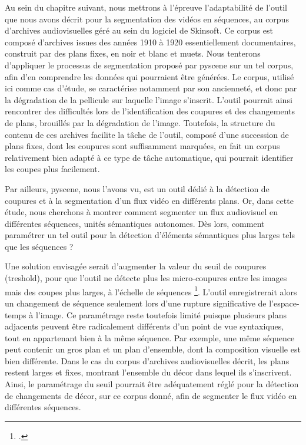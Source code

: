 Au sein du chapitre suivant, nous mettrons à l’épreuve l’adaptabilité de l’outil que nous avons décrit pour la segmentation des vidéos en séquences, au corpus d'archives audiovisuelles géré au sein du logiciel de Skinsoft. Ce corpus est composé d'archives issues des années 1910 à 1920 essentiellement documentaires, construit par des plans fixes, en noir et blanc et muets. Nous tenterons d’appliquer le processus de segmentation proposé par \gls{pyscene}  sur un tel corpus, afin d’en comprendre les données qui pourraient être générées. Le corpus, utilisé ici comme cas d'étude, se caractérise notamment par son ancienneté, et donc par la dégradation de la pellicule sur laquelle l’image s’inscrit. L'outil pourrait ainsi rencontrer des difficultés lors de l’identification des coupures et des changements de plans, brouillés par la dégradation de l’image. Toutefois, la structure du contenu de ces archives facilite la tâche de l’outil, composé d’une succession de plans fixes, dont les coupures sont suffisamment marquées, en fait un corpus relativement bien adapté à ce type de tâche automatique, qui pourrait identifier les coupes plus facilement.  

Par ailleurs, \gls{pyscene}, nous l’avons vu, est un outil dédié à la détection de coupures et à la segmentation d’un flux vidéo en différents plans. Or, dans cette étude, nous cherchons à montrer comment segmenter un flux audiovisuel en différentes séquences, unités sémantiques autonomes. Dès lors, comment paramétrer un tel outil pour la détection d'éléments sémantiques plus larges tels que les séquences ?  

Une solution envisagée serait d'augmenter la valeur du seuil de coupures (treshold), pour que l'outil ne détecte plus les micro-coupures entre les images mais des coupes plus larges, à l'échelle de séquences \footcite{zotero-item-708}. L'outil enregistrerait alors un changement de séquence seulement lors d'une rupture significative de l’espace-temps à l'image. Ce paramétrage reste toutefois limité puisque plusieurs plans adjacents peuvent être radicalement différents d’un point de vue syntaxiques, tout en appartenant bien à la même séquence. Par exemple, une même séquence peut contenir un gros plan et un plan d'ensemble, dont la composition visuelle est bien différente. Dans le cas du corpus d'archives audiovisuelles décrit, les plans restent larges et fixes, montrant l'ensemble du décor dans lequel ils s'inscrivent. Ainsi, le paramétrage du seuil pourrait être adéquatement réglé pour la détection de changements de décor, sur ce corpus donné, afin de segmenter le flux vidéo en différentes séquences.  


